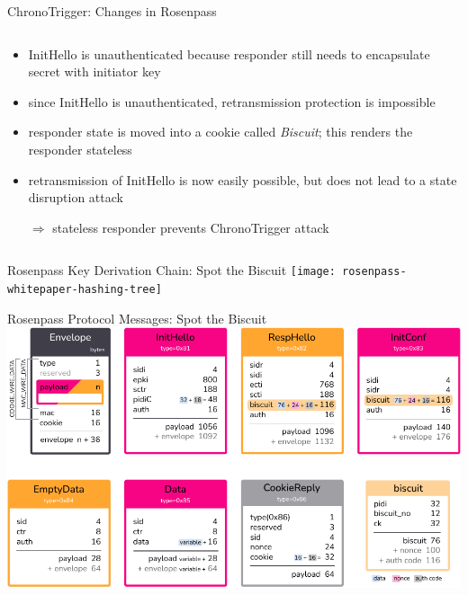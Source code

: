\begin{frame}{ChronoTrigger: Changes in Rosenpass}
\begin{columns}[fullwidth,c]
    \begin{column}{.56\linewidth}
    \small
      \begin{itemize}
        \item InitHello is unauthenticated because responder still needs to encapsulate secret with initiator key
        \item since InitHello is unauthenticated, retransmission protection is impossible
        \item responder state is moved into a cookie called \emph{Biscuit}; this renders the responder stateless
        \item retransmission of InitHello is now easily possible, but does not lead to a state disruption attack
        \item[$\Rightarrow$] stateless responder prevents ChronoTrigger attack
      \end{itemize}
    \end{column}
  \end{columns}
\end{frame}

\begin{frame}{Rosenpass Key Derivation Chain: Spot the Biscuit}
  \centering
  \texttt{[image: rosenpass-whitepaper-hashing-tree]}
\end{frame}


\begin{frame}{Rosenpass Protocol Messages: Spot the Biscuit}
\centering
    \includegraphics[height=\extendedframetextheight]{graphics/rp-messages-04-all-rgb}
\end{frame}

